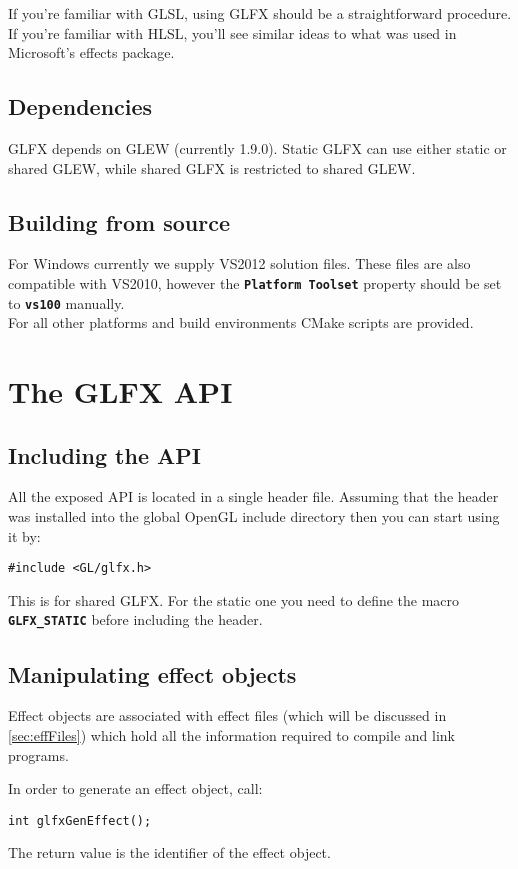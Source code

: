 \documentclass[11pt,a4paper,final,titlepage]{article}
\let\orgautoref\autoref
\renewcommand{\autoref}{%
\def\sectionautorefname{Sec.}%
\def\subsectionautorefname{Sec.}%
\def\algocflineautorefname{Alg.}%
\def\lemmaautorefname{Lemma}%
\orgautoref}
\begin{document}
If you're familiar with GLSL, using GLFX should be a straightforward procedure. If you're familiar
with HLSL, you'll see similar ideas to what was used in Microsoft's effects package.

\subsection{Dependencies}
GLFX depends on GLEW (currently 1.9.0).
Static GLFX can use either static or shared GLEW, while shared GLFX is restricted to shared GLEW.

\subsection{Building from source}
For Windows currently we supply VS2012 solution files. These files are also compatible with VS2010,
however the \texttt{\textbf{Platform Toolset}} property should be set to \texttt{\textbf{vs100}} manually.
\\For all other platforms and build environments CMake scripts are provided.

\pagebreak
\section{The GLFX API}

\subsection{Including the API}
All the exposed API is located in a single header file. Assuming that the header was installed
into the global OpenGL include directory then you can start using it by:
\begin{lstlisting}
#include <GL/glfx.h>
\end{lstlisting}
This is for shared GLFX. For the static one you need to define the macro \texttt{\textbf{GLFX\_STATIC}}
before including the header.

\subsection{Manipulating effect objects}
Effect objects are associated with effect files (which will be discussed in \autoref{sec:effFiles})
which hold all the information required to compile and link programs.

In order to generate an effect object, call:
\begin{lstlisting}
int glfxGenEffect();
\end{lstlisting}
The return value is the identifier of the effect object.
\end{document}

